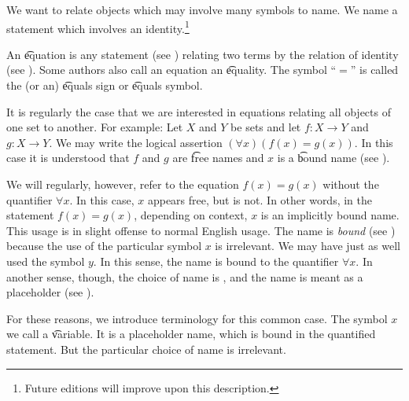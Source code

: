 

We want to relate objects which may involve many symbols to name.
We name a statement which involves an identity.\footnote{Future editions will improve upon this description.}


An \t{equation} is any statement (see ) relating two terms by the relation of identity (see ).
Some authors also call an equation an \t{equality}.
The symbol ``$=$'' is called the (or an) \t{equals sign} or \t{equals symbol}.


It is regularly the case that we are interested in equations relating all objects of one set to another.
For example:
Let $X$ and $Y$ be sets and let $f: X \to Y$ and $g: X \to Y$.
We may write the logical assertion $(\forall x)(f(x) = g(x))$.
In this case it is understood that $f$ and $g$ are \t{free} names and $x$ is a \t{bound} name (see ).

We will regularly, however, refer to the equation $f(x) = g(x)$ without the quantifier $\forall x$.
In this case, $x$ appears free, but is not.
In other words, in the statement $f(x) = g(x)$, depending on context, $x$ is an implicitly bound name.
This usage is in slight offense to normal English usage.
The name is \textit{bound} (see ) because the use of the particular symbol $x$ is irrelevant.
We may have just as well used the symbol $y$.
In this sense, the name is bound to the quantifier $\forall x$.
In another sense, though, the choice of name is , and the name is meant as a placeholder (see ).

For these reasons, we introduce terminology for this common case.
The symbol $x$ we call a \t{variable}.
It is a placeholder name, which is bound in the quantified statement.
But the particular choice of name is irrelevant.

\blankpage
